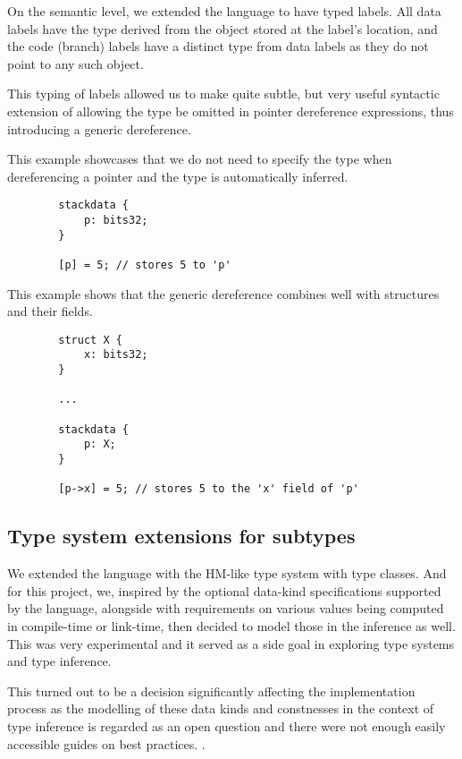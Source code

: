 On the semantic level, we extended the language to have typed labels. All data labels have the type derived from the object stored at the label's location, and the code (branch) labels have a distinct type from data labels as they do not point to any such object.

This typing of labels allowed us to make quite subtle, but very useful syntactic extension of allowing the type be omitted in pointer dereference expressions, thus introducing a generic dereference.

\begin{ex}
    This example showcases that we do not need to specify the type when dereferencing a pointer and the type is automatically inferred.

    \begin{lstlisting}
        stackdata {
            p: bits32;
        }

        [p] = 5; // stores 5 to 'p'
    \end{lstlisting}
\end{ex}

\begin{ex}
    This example shows that the generic dereference combines well with structures and their fields.

    \begin{lstlisting}
        struct X {
            x: bits32;
        }

        ...

        stackdata {
            p: X;
        }

        [p->x] = 5; // stores 5 to the 'x' field of 'p'
    \end{lstlisting}
\end{ex}

\subsection{Type system extensions for \cmm{} subtypes}

We extended the language with the HM-like type system with type classes. And for this project, we, inspired by the optional data-kind specifications supported by the \cmm{} language, alongside with requirements on various values being computed in compile-time or link-time, then decided to model those in the inference as well. This was very experimental and it served as a side goal in exploring type systems and type inference.

This turned out to be a decision significantly affecting the implementation process as the modelling of these data kinds and constnesses in the context of type inference is regarded as an open question and there were not enough easily accessible guides on best practices. .

